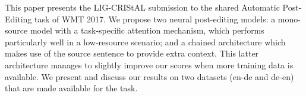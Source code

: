 This paper presents the LIG-CRIStAL submission to the shared Automatic Post-Editing task of WMT 2017. We propose two neural post-editing models: a mono-source model with a task-specific attention mechanism, which performs particularly well in a low-resource scenario; and a chained architecture which makes use of the source sentence to provide extra context. This latter architecture manages to slightly improve our scores when more training data is available. We present and discuss our results on two datasets (en-de and de-en) that are made available for the task.
